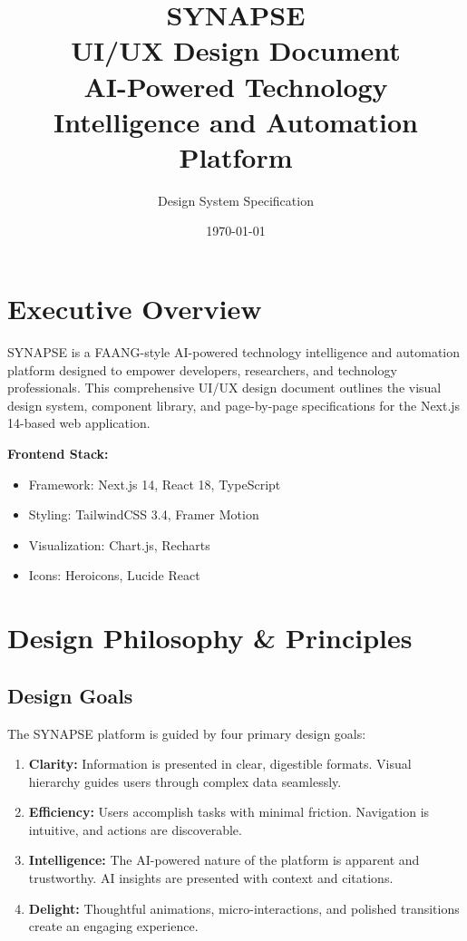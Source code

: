 \documentclass{report}
\title{\Huge\textbf{SYNAPSE}\\[0.5cm]\Large UI/UX Design Document\\[0.3cm]\normalsize AI-Powered Technology Intelligence and Automation Platform}
\author{Design System Specification}
\date{\today}
\begin{document}
\maketitle

\newpage
\tableofcontents
\newpage

\chapter{Executive Overview}

SYNAPSE is a FAANG-style AI-powered technology intelligence and automation platform designed to empower developers, researchers, and technology professionals. This comprehensive UI/UX design document outlines the visual design system, component library, and page-by-page specifications for the Next.js 14-based web application.

\textbf{Frontend Stack:}
\begin{itemize}
    \item Framework: Next.js 14, React 18, TypeScript
    \item Styling: TailwindCSS 3.4, Framer Motion
    \item Visualization: Chart.js, Recharts
    \item Icons: Heroicons, Lucide React
\end{itemize}

\chapter{Design Philosophy \& Principles}

\section{Design Goals}

The SYNAPSE platform is guided by four primary design goals:

\begin{enumerate}
    \item \textbf{Clarity:} Information is presented in clear, digestible formats. Visual hierarchy guides users through complex data seamlessly.
    \item \textbf{Efficiency:} Users accomplish tasks with minimal friction. Navigation is intuitive, and actions are discoverable.
    \item \textbf{Intelligence:} The AI-powered nature of the platform is apparent and trustworthy. AI insights are presented with context and citations.
    \item \textbf{Delight:} Thoughtful animations, micro-interactions, and polished transitions create an engaging experience.
\end{enumerate}
\end{document}
